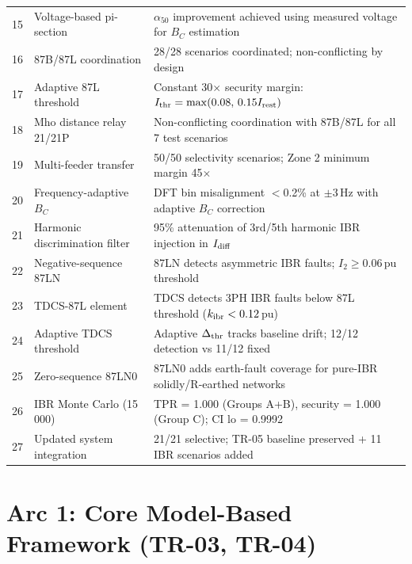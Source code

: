 \documentclass[11pt,a4paper]{article}
\begin{document}
\begin{longtable}{p{1.0cm}p{4.8cm}p{7.0cm}}
\rowcolor{arc3col!10}
15 & Voltage-based pi-section       & $\alpha_{50}$ improvement achieved using measured voltage for $B_C$ estimation \\
\rowcolor{arc3col!10}
16 & 87B/87L coordination           & 28/28 scenarios coordinated; non-conflicting by design \\
\rowcolor{arc3col!10}
17 & Adaptive 87L threshold         & Constant 30$\times$ security margin: $I_{\rm thr} = \max(0.08,\,0.15 I_{\rm rest})$ \\
\rowcolor{arc3col!10}
18 & Mho distance relay 21/21P      & Non-conflicting coordination with 87B/87L for all 7 test scenarios \\
\rowcolor{arc3col!10}
19 & Multi-feeder transfer          & 50/50 selectivity scenarios; Zone 2 minimum margin 45$\times$ \\
\midrule
\rowcolor{arc4col!10}
20 & Frequency-adaptive $B_C$       & DFT bin misalignment $<$0.2\% at $\pm 3$\,Hz with adaptive $B_C$ correction \\
\rowcolor{arc4col!10}
21 & Harmonic discrimination filter & 95\% attenuation of 3rd/5th harmonic IBR injection in $I_{\rm diff}$ \\
\rowcolor{arc4col!10}
22 & Negative-sequence 87LN         & 87LN detects asymmetric IBR faults; $I_2 \geq 0.06$\,pu threshold \\
\rowcolor{arc4col!10}
23 & TDCS-87L element               & TDCS detects 3PH IBR faults below 87L threshold ($k_{\rm ibr} < 0.12$\,pu) \\
\rowcolor{arc4col!10}
24 & Adaptive TDCS threshold        & Adaptive $\Delta_{\rm thr}$ tracks baseline drift; 12/12 detection vs 11/12 fixed \\
\rowcolor{arc4col!10}
25 & Zero-sequence 87LN0            & 87LN0 adds earth-fault coverage for pure-IBR solidly/R-earthed networks \\
\rowcolor{arc4col!10}
26 & IBR Monte Carlo (15\,000)      & TPR = 1.000 (Groups A+B), security = 1.000 (Group C); CI lo = 0.9992 \\
\rowcolor{arc4col!10}
27 & Updated system integration     & 21/21 selective; TR-05 baseline preserved + 11 IBR scenarios added \\
\end{longtable}

\section{Arc 1: Core Model-Based Framework (TR-03, TR-04)}
\end{document}
